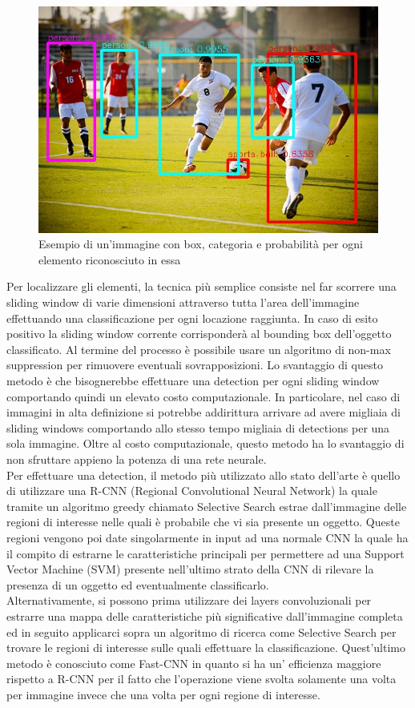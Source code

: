 \begin{figure}[H]
	\centering
	\includegraphics[width=0.7\linewidth]{images/esempio-detection.jpg}
	\caption{Esempio di un'immagine con box, categoria e probabilità per ogni elemento riconosciuto in essa}
	\label{Esempio di detection ideale}
\end{figure}
Per localizzare gli elementi, la tecnica più semplice consiste nel far scorrere una sliding window di varie dimensioni attraverso tutta l'area dell'immagine effettuando una classificazione per ogni locazione raggiunta. In caso di esito positivo la sliding window corrente corrisponderà al bounding box dell'oggetto classificato. Al termine del processo è possibile usare un algoritmo di non-max suppression per rimuovere eventuali sovrapposizioni. Lo svantaggio di questo metodo è che bisognerebbe effettuare una detection per ogni sliding window comportando quindi un elevato costo computazionale. In particolare, nel caso di immagini in alta definizione si potrebbe addirittura arrivare ad avere migliaia di sliding windows comportando allo stesso tempo migliaia di detections per una sola immagine. Oltre al costo computazionale, questo metodo ha lo svantaggio di non sfruttare appieno la potenza di una rete neurale.\\
Per effettuare una detection, il metodo più utilizzato allo stato dell'arte è quello di utilizzare una R-CNN (Regional Convolutional Neural Network) la quale tramite un algoritmo greedy chiamato Selective Search estrae dall'immagine delle regioni di interesse nelle quali è probabile che vi sia presente un oggetto. Queste regioni vengono poi date singolarmente in input ad una normale CNN la quale ha il compito di estrarne le caratteristiche principali per permettere ad una Support Vector Machine (SVM) presente nell'ultimo strato della CNN di rilevare la presenza di un oggetto ed eventualmente classificarlo.\\
Alternativamente, si possono prima utilizzare dei layers convoluzionali per estrarre una mappa delle caratteristiche più significative dall'immagine completa ed in seguito applicarci sopra un algoritmo di ricerca come Selective Search per trovare le regioni di interesse sulle quali effettuare la classificazione. Quest'ultimo metodo è conosciuto come Fast-CNN in quanto si ha un' efficienza maggiore rispetto a R-CNN per il fatto che l'operazione viene svolta solamente una volta per immagine invece che una volta per ogni regione di interesse.\\

